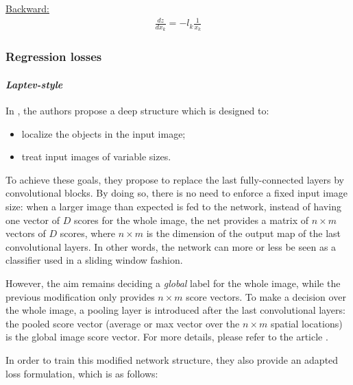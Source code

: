 \vspace{0.3cm}

\noindent
\underline{Backward:}
\begin{align}
 \frac{dz}{dx_k} = -l_k \frac{1}{x_k} \nonumber
\end{align}




\subsubsection{Regression losses}

\paragraph{\textit{Laptev-style}}
In \cite{Oquab15}, the authors propose a deep structure which is designed to:
\begin{itemize}
 \item localize the objects in the input image;
 \item treat input images of variable sizes.  
\end{itemize}
To achieve these goals, they propose to replace the last fully-connected layers by convolutional blocks. By doing so, there is no need to enforce a fixed input image size: when a larger image than expected is fed to the network, instead of having one vector of $D$ scores for the whole image, the net provides a matrix of $n \times m$ vectors of $D$ scores, where $n \times m$ is the dimension of the output map of the last convolutional layers. In other words, the network can more or less be seen as a classifier used in a sliding window fashion.  

However, the aim remains deciding a \textit{global} label for the whole image, while the previous modification only provides $n \times m$ score vectors. To make a decision over the whole image, a pooling layer is introduced after the last convolutional layers: the pooled score vector (average or max vector over the $n \times m$ spatial locations) is the global image score vector. 
For more details, please refer to the article \cite{Oquab15}. 

In order to train this modified network structure, they also provide an adapted loss formulation, which is as follows: 

  \begin{center}
  \end{center}

